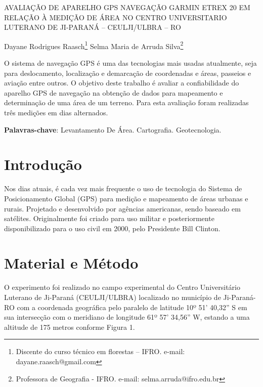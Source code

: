 \documentclass[article,12pt,onesidea,4paper,english,brazil]{abntex2}
\begin{document}
	
	\frenchspacing 
	
	\begin{center}
		\LARGE 
		AVALIAÇÃO DE APARELHO GPS NAVEGAÇÃO GARMIN ETREX 20 EM RELAÇÃO À MEDIÇÃO DE ÁREA NO CENTRO UNIVERSITARIO LUTERANO DE JI-PARANÁ – CEULJI/ULBRA – RO
		
		\normalsize
		Dayane Rodrigues Raasch\footnote{Discente do curso técnico em florestas – IFRO. e-mail: dayane.raasch@gmail.com} 
		Selma Maria de Arruda Silva\footnote{Professora de Geografia - IFRO. e-mail: selma.arruda@ifro.edu.br} 
	 
	\end{center}
	
	\begin{resumoumacoluna}
O sistema de navegação GPS é uma das tecnologias mais usadas atualmente, seja para deslocamento, localização e demarcação de coordenadas e áreas, passeios e aviação entre outros. O objetivo deste trabalho é avaliar a confiabilidade do aparelho GPS de navegação na obtenção de dados para mapeamento e determinação de uma área de um terreno. Para esta avaliação foram realizadas três medições em dias alternados.
		
		\vspace{\onelineskip}
		
		\noindent
		\textbf{Palavras-chave}: Levantamento De Área. Cartografia. Geotecnologia.
	\end{resumoumacoluna}
	
	\textual
	
	\section*{Introdução}
	
	Nos dias atuais, é cada vez mais frequente o uso de tecnologia do Sistema de Posicionamento Global (GPS) para medição e mapeamento de áreas urbanas e rurais. Projetado e desenvolvido por agências americanas, sendo baseado em satélites. Originalmente foi criado para uso militar e posteriormente disponibilizado para o uso civil em 2000, pelo Presidente Bill Clinton.
	
	\section*{Material e Método}
	
O experimento foi realizado no campo experimental do Centro Universitário Luterano de Ji-Paraná (CEULJI/ULBRA) localizado no município de Ji-Paraná-RO com a coordenada geográfica pelo paralelo de latitude 10º 51’ 40,32” S em sua intersecção com o meridiano de longitude 61º 57’ 34,56” W, estando a uma altitude de 175 metros conforme Figura 1.
\end{document}
